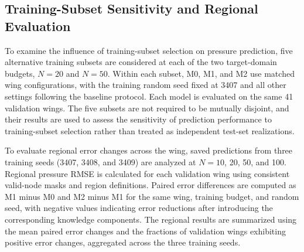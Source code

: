 
\subsection{Training-Subset Sensitivity and Regional Evaluation}
\label{subsec:training-subset-sensitivity-protocol}

To examine the influence of training-subset selection on pressure prediction, five alternative training subsets are considered at each of the two target-domain budgets, $N=20$ and $N=50$. Within each subset, M0, M1, and M2 use matched wing configurations, with the training random seed fixed at 3407 and all other settings following the baseline protocol. Each model is evaluated on the same 41 validation wings. The five subsets are not required to be mutually disjoint, and their results are used to assess the sensitivity of prediction performance to training-subset selection rather than treated as independent test-set realizations.

To evaluate regional error changes across the wing, saved predictions from three training seeds (3407, 3408, and 3409) are analyzed at $N=10$, 20, 50, and 100. Regional pressure RMSE is calculated for each validation wing using consistent valid-node masks and region definitions. Paired error differences are computed as M1 minus M0 and M2 minus M1 for the same wing, training budget, and random seed, with negative values indicating error reductions after introducing the corresponding knowledge components. The regional results are summarized using the mean paired error changes and the fractions of validation wings exhibiting positive error changes, aggregated across the three training seeds.
